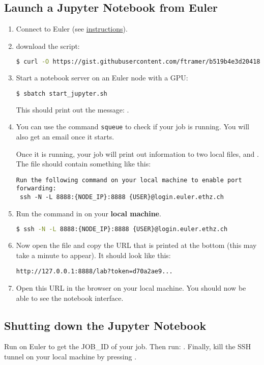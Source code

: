 \subsection{Launch a Jupyter Notebook from Euler}
\begin{enumerate}
	\item Connect to Euler (see \href{https://scicomp.ethz.ch/wiki/Accessing_the_clusters}{instructions}).

	\item download the  script:

\begin{lstlisting}[language=bash,breaklines=true]
$ curl -O https://gist.githubusercontent.com/ftramer/b519b4e3d204189b27f94b058a6c4d20/raw/start_jupyter.sh
\end{lstlisting}

	\item Start a \jupyter notebook server on an Euler node with a GPU:

\begin{lstlisting}[language=bash]
$ sbatch start_jupyter.sh
\end{lstlisting}

	This should print out the message: .

	\item You can use the command \texttt{squeue} to check if your job is running.
	You will also get an email once it starts.

	Once it is running, your job will print out information to two local files,
	 and .
	The file  should contain something like this:

\begin{lstlisting}[basicstyle=\footnotesize\ttfamily]
 Run the following command on your local machine to enable port forwarding:
 ssh -N -L 8888:{NODE_IP}:8888 {USER}@login.euler.ethz.ch
\end{lstlisting}

	\item Run the command in  on your \textbf{local machine}.

\begin{lstlisting}[language=bash]
$ ssh -N -L 8888:{NODE_IP}:8888 {USER}@login.euler.ethz.ch
\end{lstlisting}

	\item Now open the file  and copy the URL that is printed at
	the bottom (this may take a minute to appear).
	It should look like this:

\begin{lstlisting}
http://127.0.0.1:8888/lab?token=d70a2ae9...
\end{lstlisting}

	\item Open this URL in the browser on your local machine.
	You should now be able to see the \jupyter notebook interface.
\end{enumerate}

\subsection{Shutting down the Jupyter Notebook}

Run  on Euler to get the JOB\_ID of your job.
Then run: .
Finally, kill the SSH tunnel on your local machine by pressing .